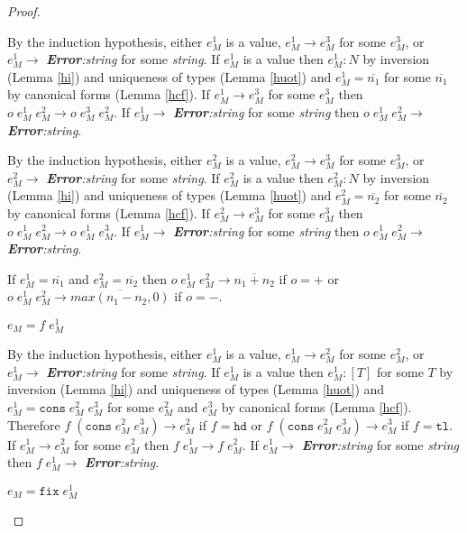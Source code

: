 \begin{mps}
\begin{proof}
\begin{mps-case-10}
By the induction hypothesis, either $e_{M}^{1}$ is a value, $e_{M}^{1}\rightarrow e_{M}^{3}$ for some $e_{M}^{3}$, or $e_{M}^{1}\rightarrow$ \emph{\textbf{Error}:\;string} for some \emph{string}.  If $e_{M}^{1}$ is a value then $e_{M}^{1}:N$ by inversion (Lemma \ref{hi}) and uniqueness of types (Lemma \ref{huot}) and $e_{M}^{1}=\overline{n_{1}}$ for some $\overline{n_{1}}$ by canonical forms (Lemma \ref{hcf}).  If $e_{M}^{1}\rightarrow e_{M}^{3}$ for some $e_{M}^{3}$ then $o\;e_{M}^{1}\;e_{M}^{2}\rightarrow o\;e_{M}^{3}\;e_{M}^{2}$.  If $e_{M}^{1}\rightarrow$ \emph{\textbf{Error}:\;string} for some \emph{string} then $o\;e_{M}^{1}\;e_{M}^{2}\rightarrow$ \emph{\textbf{Error}:\;string}.

By the induction hypothesis, either $e_{M}^{2}$ is a value, $e_{M}^{2}\rightarrow e_{M}^{3}$ for some $e_{M}^{3}$, or $e_{M}^{2}\rightarrow$ \emph{\textbf{Error}:\;string} for some \emph{string}.  If $e_{M}^{2}$ is a value then $e_{M}^{2}:N$ by inversion (Lemma \ref{hi}) and uniqueness of types (Lemma \ref{huot}) and $e_{M}^{2}=\overline{n_{2}}$ for some $\overline{n_{2}}$ by canonical forms (Lemma \ref{hcf}).  If $e_{M}^{2}\rightarrow e_{M}^{3}$ for some $e_{M}^{3}$ then $o\;e_{M}^{1}\;e_{M}^{2}\rightarrow o\;e_{M}^{1}\;e_{M}^{3}$.  If $e_{M}^{1}\rightarrow$ \emph{\textbf{Error}:\;string} for some \emph{string} then $o\;e_{M}^{1}\;e_{M}^{2}\rightarrow$ \emph{\textbf{Error}:\;string}.

If $e_{M}^{1}=\overline{n_{1}}$ and $e_{M}^{2}=\overline{n_{2}}$ then $o\;e_{M}^{1}\;e_{M}^{2}\rightarrow \overline{n_{1}+n_{2}}$ if $o=+$ or $o\;e_{M}^{1}\;e_{M}^{2}\rightarrow \overline{max(n_{1}-n_{2},0)}$ if $o=-$.
\end{mps-case-10}
\begin{mps-case-11}
$e_{M}=f\;e_{M}^{1}$

By the induction hypothesis, either $e_{M}^{1}$ is a value, $e_{M}^{1}\rightarrow e_{M}^{2}$ for some $e_{M}^{2}$, or $e_{M}^{1}\rightarrow$ \emph{\textbf{Error}:\;string} for some \emph{string}.  If $e_{M}^{1}$ is a value then $e_{M}^{1}:[T]$ for some $T$ by inversion (Lemma \ref{hi}) and uniqueness of types (Lemma \ref{huot}) and $e_{M}^{1}=\mathtt{cons}\;e_{M}^{2}\;e_{M}^{3}$ for some $e_{M}^{2}$ and $e_{M}^{3}$ by canonical forms (Lemma \ref{hcf}).  Therefore $f\;(\mathtt{cons}\;e_{M}^{2}\;e_{M}^{3})\rightarrow e_{M}^{2}$ if $f=\mathtt{hd}$ or $f\;(\mathtt{cons}\;e_{M}^{2}\;e_{M}^{3})\rightarrow e_{M}^{3}$ if $f=\mathtt{tl}$.  If $e_{M}^{1}\rightarrow e_{M}^{2}$ for some $e_{M}^{2}$ then $f\;e_{M}^{1}\rightarrow f\;e_{M}^{2}$.  If $e_{M}^{1}\rightarrow$ \emph{\textbf{Error}:\;string} for some \emph{string} then $f\;e_{M}^{1}\rightarrow$ \emph{\textbf{Error}:\;string}.
\end{mps-case-11}
\begin{mps-case-12}
$e_{M}=\mathtt{fix}\;e_{M}^{1}$


\end{mps-case-12}
\end{proof}
\end{mps}
